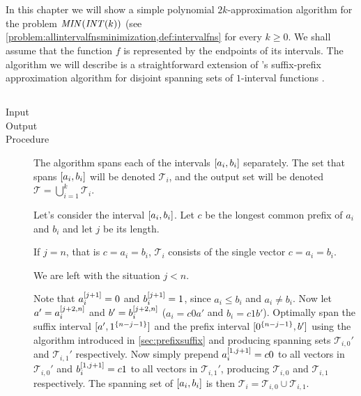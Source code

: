 \chapter{}
\label{chap:2kapprox}

In this chapter
we will show a simple polynomial
$2k$-approximation algorithm for the problem
$\mathit{MIN} (\mathit{INT} (k))$
(see
\cref{problem:allintervalfnsminimization,def:intervalfns}
for every $k \geq 0$.
We shall assume that the function $f$ is represented by the endpoints of its intervals.
The algorithm we will describe is a straightforward
extension of
\citeauthor{Schieber2005154}'s suffix-prefix
approximation algorithm
for disjoint spanning sets of $1$-interval functions
\citep[Section 6]{Schieber2005154}.

\section{\algdesctitle}

\begin{algorithm}
\label{algorithm:spd}

\hfill

\begin{description}
\item[Input]
\minintinput

\item[Output]
\minintoutput

\item[Procedure]
The algorithm spans each of
the intervals $[a_i, b_i]$ separately.
The set that spans $[a_i, b_i]$ will be denoted
$\mathcal{T}_i$,
and the output set will be denoted
$\mathcal{T} = \bigcup_{i=1}^k{\mathcal{T}_i}$.

Let's consider the interval $[a_i, b_i]$.
Let $c$ be the longest common prefix of $a_i$ and $b_i$
and let $j$ be its length.

If $j = n$, that is $c = a_i = b_i$,
$\mathcal{T}_i$ consists of the single vector
$c = a_i = b_i$.

We are left with the situation $j < n$.

Note that $a_i^{[j+1]} = 0$ and $b_i^{[j+1]} = 1$,
since $a_i \leq b_i$ and $a_i \neq b_i$.
Now let $a' = a_i^{[j+2, n]}$
and $b' = b_i^{[j+2, n]}$
($a_i = c 0 a'$ and $b_i = c 1 b'$).
Optimally span the suffix interval
$[a', 1^{\{n-j-1\}}]$
and the prefix interval
$[0^{\{n-j-1\}}, b']$
using the
algorithm
introduced in \cref{sec:prefixsuffix}
and producing spanning sets
$\mathcal{T}_{i, 0}'$
and $\mathcal{T}_{i, 1}'$ respectively.
Now simply prepend $a_i^{[1, j+1]} = c 0$
to all vectors in $\mathcal{T}_{i, 0}'$
and $b_i^{[1, j+1]} = c 1$
to all vectors in $\mathcal{T}_{i, 1}'$,
producing $\mathcal{T}_{i, 0}$
and $\mathcal{T}_{i, 1}$ respectively.
The spanning set of $[a_i, b_i]$
is then
$\mathcal{T}_i
= \mathcal{T}_{i, 0} \cup \mathcal{T}_{i, 1}$.
\end{description}
\end{algorithm}

